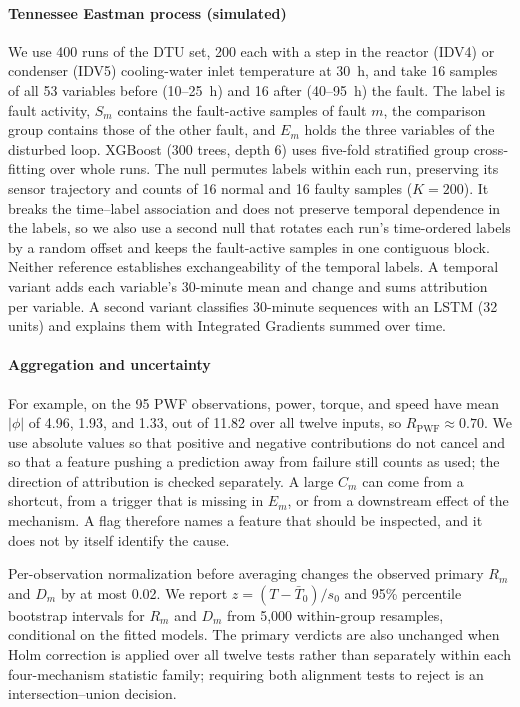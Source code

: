 \documentclass[10pt]{article}
\begin{document}
\paragraph{Tennessee Eastman process (simulated)} We use 400 runs of the DTU set, 200 each with a step in the reactor (IDV4) or condenser (IDV5) cooling-water inlet temperature at 30~h, and take 16 samples of all 53 variables before (10--25~h) and 16 after (40--95~h) the fault. The label is fault activity, $S_m$ contains the fault-active samples of fault $m$, the comparison group contains those of the other fault, and $E_m$ holds the three variables of the disturbed loop. XGBoost (300 trees, depth 6) uses five-fold stratified group cross-fitting over whole runs. The null permutes labels within each run, preserving its sensor trajectory and counts of 16 normal and 16 faulty samples ($K=200$). It breaks the time--label association and does not preserve temporal dependence in the labels, so we also use a second null that rotates each run's time-ordered labels by a random offset and keeps the fault-active samples in one contiguous block. Neither reference establishes exchangeability of the temporal labels. A temporal variant adds each variable's 30-minute mean and change and sums attribution per variable. A second variant classifies 30-minute sequences with an LSTM (32 units) and explains them with Integrated Gradients summed over time.


\paragraph{Aggregation and uncertainty} For example, on the 95 PWF observations, power, torque, and speed have mean $|\phi|$ of 4.96, 1.93, and 1.33, out of 11.82 over all twelve inputs, so $R_{\mathrm{PWF}}\approx0.70$. We use absolute values so that positive and negative contributions do not cancel and so that a feature pushing a prediction away from failure still counts as used; the direction of attribution is checked separately. A large $C_m$ can come from a shortcut, from a trigger that is missing in $E_m$, or from a downstream effect of the mechanism. A flag therefore names a feature that should be inspected, and it does not by itself identify the cause.

 Per-observation normalization before averaging changes the observed primary $R_m$ and $D_m$ by at most 0.02. We report $z=(T-\bar T_0)/s_0$ and 95\% percentile bootstrap intervals for $R_m$ and $D_m$ from 5,000 within-group resamples, conditional on the fitted models. The primary verdicts are also unchanged when Holm correction is applied over all twelve tests rather than separately within each four-mechanism statistic family; requiring both alignment tests to reject is an intersection--union decision.
\end{document}
